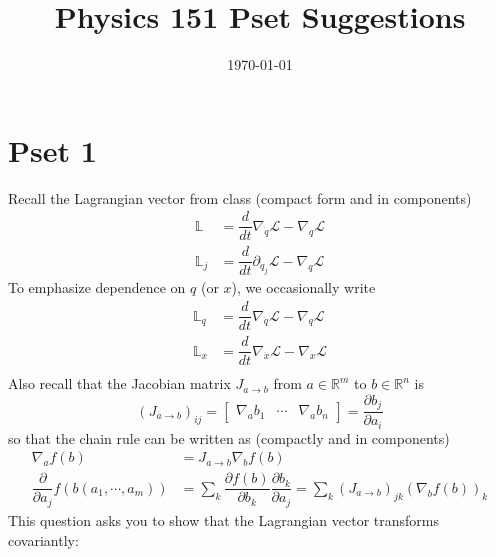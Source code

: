 \documentclass[12pt]{article}
\begin{document}
\title{Physics 151 Pset Suggestions}
\date{\today}
\maketitle

\section{Pset 1}

Recall the Lagrangian vector from class (compact form and in components)
\[ 
    \begin{aligned}
        \mathbb L 
        &= \dfrac d {dt} \nabla_{\dot q} \mathcal L - \nabla_q \mathcal L \\ 
        \mathbb L_j 
        &= \dfrac d {dt} \partial_{\dot q_j} \mathcal L - \nabla_q \mathcal L 
    \end{aligned}
\] 
To emphasize dependence on $q$ (or $x$), we occasionally write 
\[\begin{aligned}
    \mathbb L_q &= \dfrac d {dt} \nabla_{\dot q} \mathcal L - \nabla_q \mathcal L \\ 
    \mathbb L_x &= \dfrac d {dt} \nabla_{\dot x} \mathcal L - \nabla_x \mathcal L \\ 
\end{aligned}\] 
Also recall that the Jacobian matrix $J_{a\to b}$ from $a\in {\mathbb R}^m$ to $b\in {\mathbb R}^n$ is 
\[ 
    (J_{a\to b})_{ij} = \begin{bmatrix}
        \nabla_a b_1 & \cdots & \nabla_a b_n 
    \end{bmatrix} = \dfrac{\partial b_j}{\partial a_i}
\] 
so that the chain rule can be written as (compactly and in components) 
\[ 
    \begin{aligned}
        \nabla_a f(b) &= J_{a\to b} \nabla_b f(b)\\ 
        \dfrac{\partial}{\partial a_j} f(b(a_1, \cdots, a_m)) &= 
        \sum_k \dfrac{\partial f(b)}{\partial b_k} \dfrac{\partial b_k}{\partial a_j}
        = \sum_k (J_{a\to b})_{jk} (\nabla_b f(b))_k 
    \end{aligned}
\] 
This question asks you to show that the Lagrangian 
vector transforms covariantly:
\end{document}
